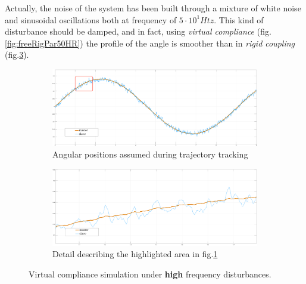 \newpage

Actually, the noise of the system has been built through a mixture of white
noise and sinusoidal oscillations both at frequency of $5\cdot 10^{1} Htz$.
\newline
This kind of disturbance should be damped, and in fact, using \textsl{virtual
  compliance} (fig.\ref{fig:freeRigPar50HR}) the profile of the angle is smoother
than in \textsl{rigid coupling} (fig.\ref{fig:freeSetPar50HR}).

\bigskip


\begin{figure}[h]
	\begin{subfigure}[h!]{1\linewidth}
		\centering
		\includegraphics[width=\textwidth, height=0.48\textwidth]{Images/set20freeTot50HtznoiseRect}
		\caption{Angular positions assumed during trajectory tracking}
		\label{fig:freeSetTot50HR}
	\end{subfigure}	
  \newline
	\begin{subfigure}[h!]{1\linewidth}
		\centering
		\includegraphics[width=\textwidth, height=0.48\textwidth]{Images/set20freePart50Htznoise}
		\caption{Detail describing the highlighted area in fig.\ref{fig:freeSetTot50HR}}
		\label{fig:freeSetPar50HR}
	\end{subfigure}	
  \caption{ Virtual compliance simulation under \textbf{high} frequency disturbances. }
\end{figure}


